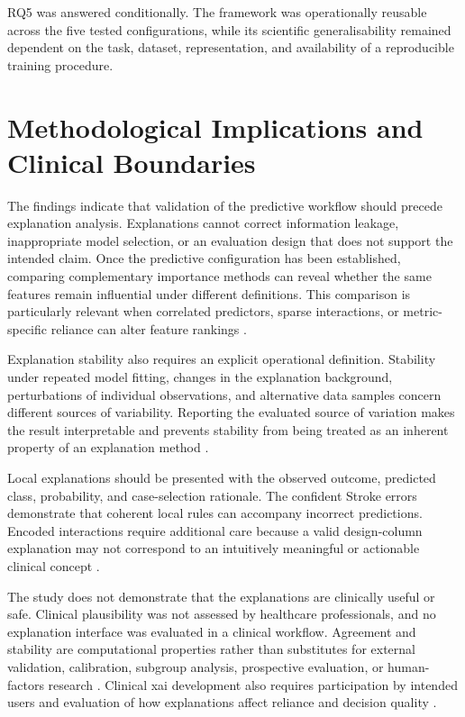 RQ5 was answered conditionally. The framework was operationally reusable across the five tested configurations, while its scientific generalisability remained dependent on the task, dataset, representation, and availability of a reproducible training procedure.

\section{Methodological Implications and Clinical Boundaries}

The findings indicate that validation of the predictive workflow should precede explanation analysis. Explanations cannot correct information leakage, inappropriate model selection, or an evaluation design that does not support the intended claim. Once the predictive configuration has been established, comparing complementary importance methods can reveal whether the same features remain influential under different definitions. This comparison is particularly relevant when correlated predictors, sparse interactions, or metric-specific reliance can alter feature rankings \citep{fisher_models_2019, strobl_conditional_2008, vilone_classification_2021}.

Explanation stability also requires an explicit operational definition. Stability under repeated model fitting, changes in the explanation background, perturbations of individual observations, and alternative data samples concern different sources of variability. Reporting the evaluated source of variation makes the result interpretable and prevents stability from being treated as an inherent property of an explanation method \citep{lofstrom_meta_2022, canha_functionally-grounded_2025}.

Local explanations should be presented with the observed outcome, predicted class, probability, and case-selection rationale. The confident Stroke errors demonstrate that coherent local rules can accompany incorrect predictions. Encoded interactions require additional care because a valid design-column explanation may not correspond to an intuitively meaningful or actionable clinical concept \citep{ribeiro_why_2016, vasconcelos_explanations_2023, lee_understanding_2023}.

The study does not demonstrate that the explanations are clinically useful or safe. Clinical plausibility was not assessed by healthcare professionals, and no explanation interface was evaluated in a clinical workflow. Agreement and stability are computational properties rather than substitutes for external validation, calibration, subgroup analysis, prospective evaluation, or human-factors research \citep{collins_tripodai_2024, moons_probastai_2025, van_calster_calibration_2019, vasey_decideai_2022}. Clinical \gls{xai} development also requires participation by intended users and evaluation of how explanations affect reliance and decision quality \citep{panigutti_co-design_2023, allgaier_how_2023}.

